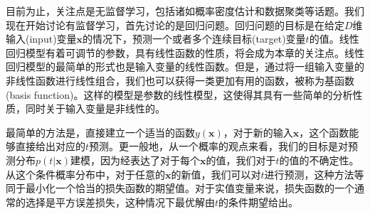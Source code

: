 目前为止，关注点是无监督学习，包括诸如概率密度估计和数据聚类等话题。我们现在开始讨论有监督学习，首先讨论的是回归问题。回归问题的目标是在给定$D$维输入(input)变量$\boldsymbol{x}$的情况下，预测一个或者多个连续目标(target)变量$t$的值。线性回归模型有着可调节的参数，具有线性函数的性质，将会成为本章的关注点。线性回归模型的最简单的形式也是输入变量的线性函数。但是，通过将一组输入变量的非线性函数进行线性组合，我们也可以获得一类更加有用的函数，被称为基函数(basis function)。这样的模型是参数的线性模型，这使得其具有一些简单的分析性质，同时关于输入变量是非线性的。

最简单的方法是，直接建立一个适当的函数$y(\boldsymbol{x})$，对于新的输入$\boldsymbol{x}$，这个函数能够直接给出对应的$t$预测。更一般地，从一个概率的观点来看，我们的目标是对预测分布$p(t|\boldsymbol{x})$建模，因为经表达了对于每个$\boldsymbol{x}$的值，我们对于$t$的值的不确定性。从这个条件概率分布中，对于任意的$\boldsymbol{x}$的新值，我们可以对$t$进行预测，这种方法等同于最小化一个恰当的损失函数的期望值。对于实值变量来说，损失函数的一个通常的选择是平方误差损失，这种情况下最优解由$t$的条件期望给出。